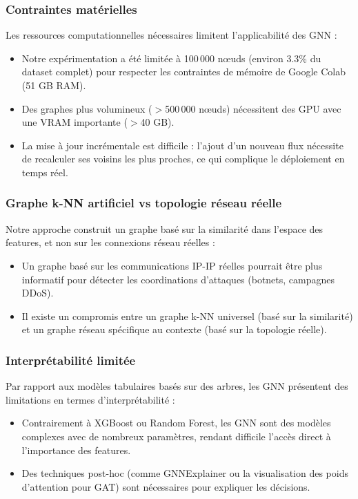 ﻿\documentclass[11pt,a4paper]{article}
\begin{document}
\subsubsection{Contraintes matérielles}

Les ressources computationnelles nécessaires limitent l'applicabilité des GNN :
\begin{itemize}
    \item Notre expérimentation a été limitée à 100\,000 nœuds (environ 3.3\% du dataset complet) pour respecter les contraintes de mémoire de Google Colab (51 GB RAM).
    \item Des graphes plus volumineux ($>$500\,000 nœuds) nécessitent des GPU avec une VRAM importante ($>$40 GB).
    \item La mise à jour incrémentale est difficile : l'ajout d'un nouveau flux nécessite de recalculer ses voisins les plus proches, ce qui complique le déploiement en temps réel.
\end{itemize}

\subsubsection{Graphe k-NN artificiel vs topologie réseau réelle}

Notre approche construit un graphe basé sur la similarité dans l'espace des features, et non sur les connexions réseau réelles :
\begin{itemize}
    \item Un graphe basé sur les communications IP-IP réelles pourrait être plus informatif pour détecter les coordinations d'attaques (botnets, campagnes DDoS).
    \item Il existe un compromis entre un graphe k-NN universel (basé sur la similarité) et un graphe réseau spécifique au contexte (basé sur la topologie réelle).
    \end{itemize}

\subsubsection{Interprétabilité limitée}

Par rapport aux modèles tabulaires basés sur des arbres, les GNN présentent des limitations en termes d'interprétabilité :
    \begin{itemize}
    \item Contrairement à XGBoost ou Random Forest, les GNN sont des modèles complexes avec de nombreux paramètres, rendant difficile l'accès direct à l'importance des features.
    \item Des techniques post-hoc (comme GNNExplainer ou la visualisation des poids d'attention pour GAT) sont nécessaires pour expliquer les décisions.
    \end{itemize}
\end{document}
